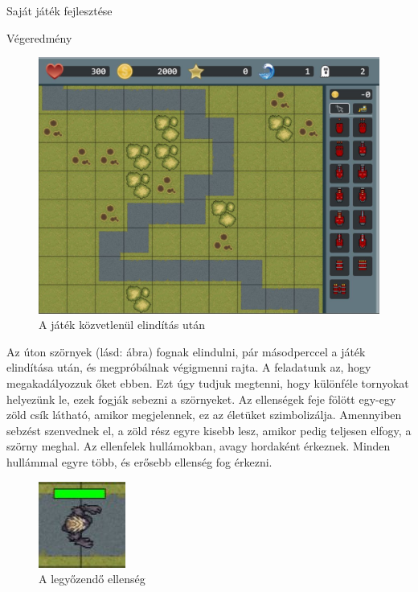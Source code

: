 \begin{MyChapter}{Saját játék fejlesztése}
\begin{MySection}{Végeredmény}
		\begin{figure}[h!]
			\centering
			\includegraphics[scale=0.57]{kepek/jatekHasznalat/game_scene}
			\caption{A játék közvetlenül elindítás után}
			\label{fig:jatekHasznalat:game_scene}
		\end{figure}
		
		Az úton szörnyek (lásd:  ábra) fognak elindulni, pár másodperccel a játék elindítása után, és megpróbálnak végigmenni rajta. A feladatunk az, hogy megakadályozzuk őket ebben. Ezt úgy tudjuk megtenni, hogy különféle tornyokat helyezünk le, ezek fogják sebezni a szörnyeket.
		Az ellenségek feje fölött egy-egy zöld csík látható, amikor megjelennek, ez az életüket szimbolizálja. Amennyiben sebzést szenvednek el, a zöld rész egyre kisebb lesz, amikor pedig teljesen elfogy, a szörny meghal. Az ellenfelek hullámokban, avagy hordaként érkeznek. Minden hullámmal egyre több, és erősebb ellenség fog érkezni.
		
		\begin{figure}[h!]
			\centering
			\includegraphics[scale=1.6]{kepek/jatekHasznalat/szorny}
			\caption{A legyőzendő ellenség}
			\label{fig:jatekHasznalat:szorny}
		\end{figure}
		

\end{MySection}
\end{MyChapter}
